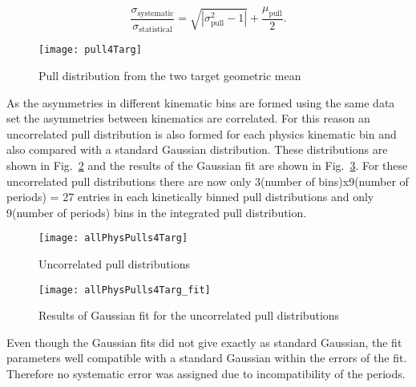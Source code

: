 \begin{equation}
  \label{equ::sysErrorPull}
  \frac{\sigma_{\mathrm{systematic}}}{\sigma_{\mathrm{statistical}}} =
  \sqrt{|\sigma^2_{\mathrm{pull}} - 1|} + \frac{\mu_{\mathrm{pull}}}{2}.
\end{equation}

\begin{figure}[h!t]
  \begin{center}
    \texttt{[image: pull4Targ]}
    \caption{Pull distribution from the two target geometric mean}
    \label{fig::pull4Targ}
  \end{center}
\end{figure}

\noindent
As the asymmetries in different kinematic bins are formed using the same data
set the asymmetries between kinematics are correlated.  For this reason an
uncorrelated pull distribution is also formed for each physics kinematic bin and
also compared with a standard Gaussian distribution.  These distributions are
shown in Fig.~\ref{fig::allPhysPulls4Targ} and the results of the Gaussian fit
are shown in Fig.~\ref{fig::allPhysPulls4Targ_fit}.  For these uncorrelated pull
distributions there are now only 3(number of bins)x9(number of periods) = 27
entries in each kinetically binned pull distributions and only 9(number of
periods) bins in the integrated pull distribution.

\begin{figure}[h!t]
  \begin{center}
    \texttt{[image: allPhysPulls4Targ]}
    \caption{Uncorrelated pull distributions}
    \label{fig::allPhysPulls4Targ}
  \end{center}
\end{figure}

\begin{figure}[h!t]
  \begin{center}
    \texttt{[image: allPhysPulls4Targ\_fit]}
    \caption{Results of Gaussian fit for the uncorrelated pull distributions}
    \label{fig::allPhysPulls4Targ_fit}
  \end{center}
\end{figure}

Even though the Gaussian fits did not give exactly as standard Gaussian, the fit
parameters well compatible with a standard Gaussian within the errors of the
fit.  Therefore no systematic error was assigned due to incompatibility of the
periods.

